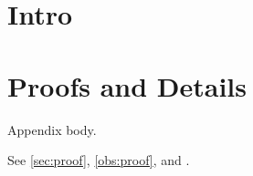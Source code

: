 \section{Intro}
\appendices
\section[Proof Notes]{Proofs and Details}\label{sec:proof}
\begin{oblemma}\label{obs:proof}
Appendix body.
\end{oblemma}
See \autoref{sec:proof}, \cref{obs:proof}, and .
